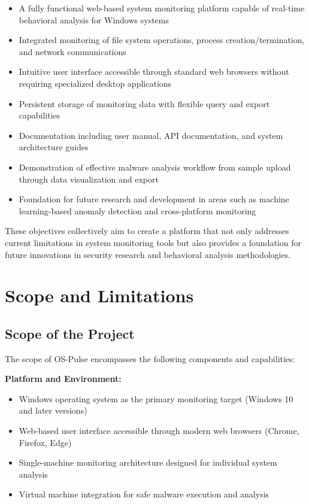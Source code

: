 \begin{itemize}
    \item A fully functional web-based system monitoring platform capable of real-time behavioral analysis for Windows systems
    \item Integrated monitoring of file system operations, process creation/termination, and network communications
    \item Intuitive user interface accessible through standard web browsers without requiring specialized desktop applications
    \item Persistent storage of monitoring data with flexible query and export capabilities
    \item Documentation including user manual, API documentation, and system architecture guides
    \item Demonstration of effective malware analysis workflow from sample upload through data visualization and export
    \item Foundation for future research and development in areas such as machine learning-based anomaly detection and cross-platform monitoring
\end{itemize}

These objectives collectively aim to create a platform that not only addresses current limitations in system monitoring tools but also provides a foundation for future innovations in security research and behavioral analysis methodologies.

\section{Scope and Limitations}

\subsection*{Scope of the Project}

The scope of OS-Pulse encompasses the following components and capabilities:

\textbf{Platform and Environment:}
\begin{itemize}
    \item Windows operating system as the primary monitoring target (Windows 10 and later versions)
    \item Web-based user interface accessible through modern web browsers (Chrome, Firefox, Edge)
    \item Single-machine monitoring architecture designed for individual system analysis
    \item Virtual machine integration for safe malware execution and analysis
\end{itemize}


